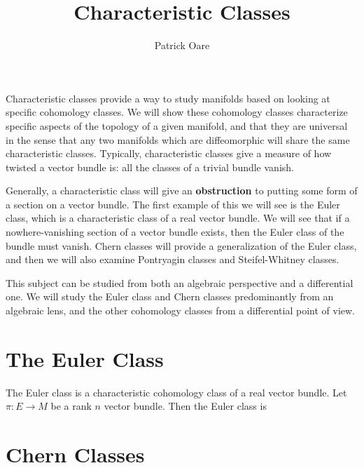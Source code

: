 \documentclass[11pt, oneside]{article}   	%
\title{Characteristic Classes}
\author{Patrick Oare}
\date{}							%
\theoremstyle{definition}
\begin{document}
\maketitle

Characteristic classes provide a way to study manifolds based on looking at specific cohomology classes. We will show these 
cohomology classes characterize specific aspects of the topology of a given manifold, and that they are universal in the sense 
that any two manifolds which are diffeomorphic will share the same characteristic classes. Typically, characteristic classes 
give a measure of how twisted a vector bundle is: all the classes of a trivial bundle vanish.

Generally, a characteristic class will give an \textbf{obstruction} to putting some form of a section on a vector bundle. The 
first example of this we will see is the Euler class, which is a characteristic class of a real vector bundle. We will see that if 
a nowhere-vanishing section of a vector bundle exists, then the Euler class of the bundle must vanish. Chern classes will 
provide a generalization of the Euler class, and then we will also examine Pontryagin classes and Steifel-Whitney classes. 

This subject can be studied from both an algebraic perspective and a differential one. We will study the Euler class and 
Chern classes predominantly from an algebraic lens, and the other cohomology classes from a differential point of view.

\section{The Euler Class}

The Euler class is a characteristic cohomology class of a real vector bundle. Let $\pi : E\rightarrow M$ be a rank $n$ vector 
bundle. Then the Euler class is

\section{Chern Classes}
\end{document}
